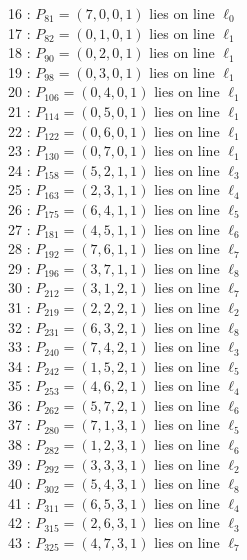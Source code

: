 \documentclass{article}
\begin{document}
{\begin{multicols}{2}
16 : $P_{81}=( 7, 0, 0, 1 )$ lies on line $\ell_{0}$\\
17 : $P_{82}=( 0, 1, 0, 1 )$ lies on line $\ell_{1}$\\
18 : $P_{90}=( 0, 2, 0, 1 )$ lies on line $\ell_{1}$\\
19 : $P_{98}=( 0, 3, 0, 1 )$ lies on line $\ell_{1}$\\
20 : $P_{106}=( 0, 4, 0, 1 )$ lies on line $\ell_{1}$\\
21 : $P_{114}=( 0, 5, 0, 1 )$ lies on line $\ell_{1}$\\
22 : $P_{122}=( 0, 6, 0, 1 )$ lies on line $\ell_{1}$\\
23 : $P_{130}=( 0, 7, 0, 1 )$ lies on line $\ell_{1}$\\
24 : $P_{158}=( 5, 2, 1, 1 )$ lies on line $\ell_{3}$\\
25 : $P_{163}=( 2, 3, 1, 1 )$ lies on line $\ell_{4}$\\
26 : $P_{175}=( 6, 4, 1, 1 )$ lies on line $\ell_{5}$\\
27 : $P_{181}=( 4, 5, 1, 1 )$ lies on line $\ell_{6}$\\
28 : $P_{192}=( 7, 6, 1, 1 )$ lies on line $\ell_{7}$\\
29 : $P_{196}=( 3, 7, 1, 1 )$ lies on line $\ell_{8}$\\
30 : $P_{212}=( 3, 1, 2, 1 )$ lies on line $\ell_{7}$\\
31 : $P_{219}=( 2, 2, 2, 1 )$ lies on line $\ell_{2}$\\
32 : $P_{231}=( 6, 3, 2, 1 )$ lies on line $\ell_{8}$\\
33 : $P_{240}=( 7, 4, 2, 1 )$ lies on line $\ell_{3}$\\
34 : $P_{242}=( 1, 5, 2, 1 )$ lies on line $\ell_{5}$\\
35 : $P_{253}=( 4, 6, 2, 1 )$ lies on line $\ell_{4}$\\
36 : $P_{262}=( 5, 7, 2, 1 )$ lies on line $\ell_{6}$\\
37 : $P_{280}=( 7, 1, 3, 1 )$ lies on line $\ell_{5}$\\
38 : $P_{282}=( 1, 2, 3, 1 )$ lies on line $\ell_{6}$\\
39 : $P_{292}=( 3, 3, 3, 1 )$ lies on line $\ell_{2}$\\
40 : $P_{302}=( 5, 4, 3, 1 )$ lies on line $\ell_{8}$\\
41 : $P_{311}=( 6, 5, 3, 1 )$ lies on line $\ell_{4}$\\
42 : $P_{315}=( 2, 6, 3, 1 )$ lies on line $\ell_{3}$\\
43 : $P_{325}=( 4, 7, 3, 1 )$ lies on line $\ell_{7}$\\

\end{multicols}}
\end{document}
